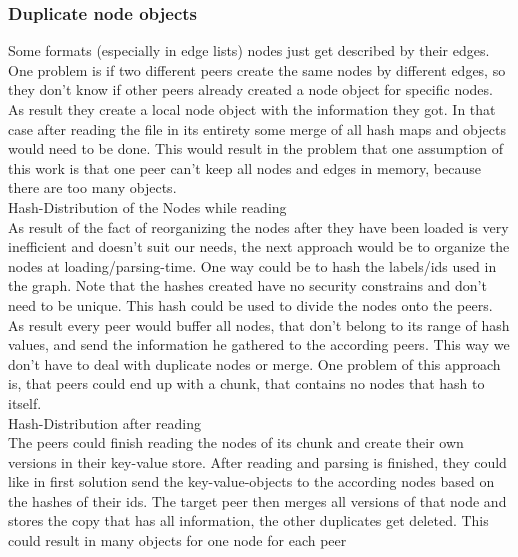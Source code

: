 \subsubsection{Duplicate node objects}
Some formats (especially in edge lists) nodes just get described by their edges. One problem is if two different peers create the same nodes by different edges, so they don’t know if other peers already created a node object for specific nodes. As result they create a local node object with the information they got. In that case after reading the file in its entirety some merge of all hash maps and objects would need to be done. This would result in the problem that one assumption of this work is that one peer can’t keep all nodes and edges in memory, because there are too many objects.\\
Hash-Distribution of the Nodes while reading\\
As result of the fact of reorganizing the nodes after they have been loaded is very inefficient and doesn’t suit our needs, the next approach would be to organize the nodes at loading/parsing-time.
One way could be to hash the labels/ids used in the graph. Note that the hashes created have no security constrains and don’t need to be unique. This hash could be used to divide the nodes onto the peers. As result every peer would buffer all nodes, that don’t belong to its range of hash values, and send the information he gathered to the according peers. This way we don’t have to deal with duplicate nodes or merge. One problem of this approach is, that peers could end up with a chunk, that contains no nodes that hash to itself.\\
Hash-Distribution after reading\\
The peers could finish reading the nodes of its chunk and create their own versions in their key-value store. After reading and parsing is finished, they could like in first solution send the key-value-objects to the according nodes based on the hashes of their ids. The target peer then merges all versions of that node and stores the copy that has all information, the other duplicates get deleted. This could result in many objects for one node for each peer

